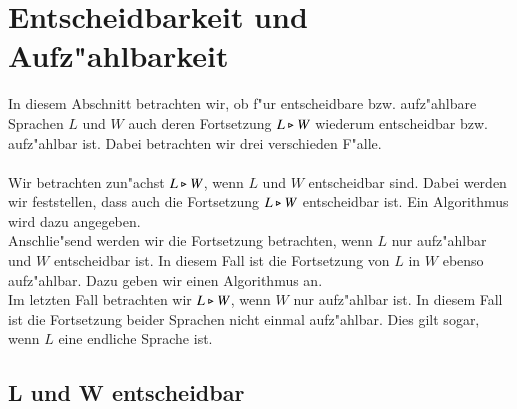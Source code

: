 \section{Entscheidbarkeit und Aufz"ahlbarkeit}
In diesem Abschnitt betrachten wir, ob f"ur entscheidbare bzw. aufz"ahlbare Sprachen $L$ und $W$ auch deren Fortsetzung $L\triangleright W$ wiederum entscheidbar bzw. aufz"ahlbar ist. Dabei betrachten wir drei verschieden F"alle.\\\\
Wir betrachten zun"achst $L\triangleright W$, wenn $L$ und $W$ entscheidbar sind. Dabei werden wir feststellen, dass auch die Fortsetzung $L\triangleright W$ entscheidbar ist. Ein Algorithmus wird dazu angegeben.\\
Anschlie"send werden wir die Fortsetzung betrachten, wenn $L$ nur aufz"ahlbar und $W$ entscheidbar ist. In diesem Fall ist die Fortsetzung von $L$ in $W$ ebenso aufz"ahlbar. Dazu geben wir einen Algorithmus an.\\
Im letzten Fall betrachten wir $L\triangleright W$, wenn $W$ nur aufz"ahlbar ist. In diesem Fall ist die Fortsetzung beider Sprachen nicht einmal aufz"ahlbar. Dies gilt sogar, wenn $L$ eine endliche Sprache ist.
\subsection{L und W entscheidbar}

